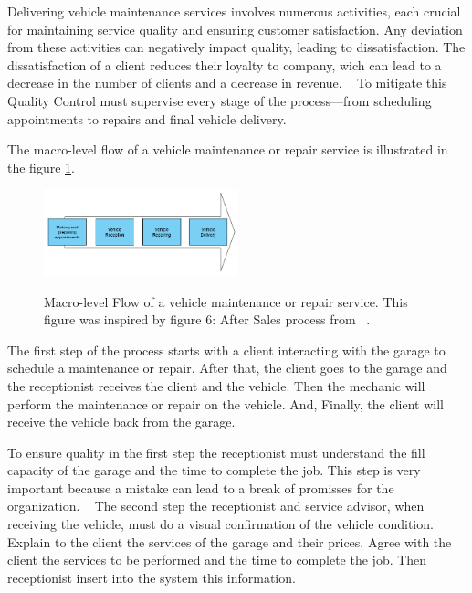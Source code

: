 Delivering vehicle maintenance services involves numerous activities, each crucial for maintaining service quality and ensuring customer satisfaction. 
Any deviation from these activities can negatively impact quality, leading to dissatisfaction. 
The dissatisfaction of a client reduces their loyalty to company, wich can lead to a decrease in the number of clients and a decrease in revenue. ~\cite{Setting_the_after_sale_process}
To mitigate this Quality Control must supervise every stage of the process—from scheduling appointments to repairs and final vehicle delivery. ~\cite{Setting_the_after_sale_process}

The macro-level flow of a vehicle maintenance or repair service is illustrated in the figure \ref{fig:Vehicle_maintenace_macro}. 




\begin{figure}[h]
  \caption{Macro-level Flow of a vehicle maintenance or repair service. This figure was inspired by figure 6: After Sales process from ~\citet{Setting_the_after_sale_process}.}
  \centering
  \includegraphics[width=0.50\textwidth]{figs/Vehicle_maintenace_macro}
  \label{fig:Vehicle_maintenace_macro}
\end{figure}


The first step of the process starts with a client interacting with the garage to schedule a maintenance or repair. 
After that, the client goes to the garage and the receptionist receives the client and the vehicle.
Then the mechanic will perform the maintenance or repair on the vehicle.
And, Finally, the client will receive the vehicle back from the garage.

To ensure quality in the first step the receptionist must understand the fill capacity of the garage and the time to complete the job. 
This step is very important because a mistake can lead to a break of promisses for the organization. ~\cite{Setting_the_after_sale_process}
The second step the receptionist and service advisor, when receiving the vehicle, must do a visual confirmation of the vehicle condition. ~\cite{Setting_the_after_sale_process}
Explain to the client the services of the garage and their prices. Agree with the client the services to be performed and the time to complete the job. 
Then receptionist insert into the system this information. ~\cite{Setting_the_after_sale_process}


